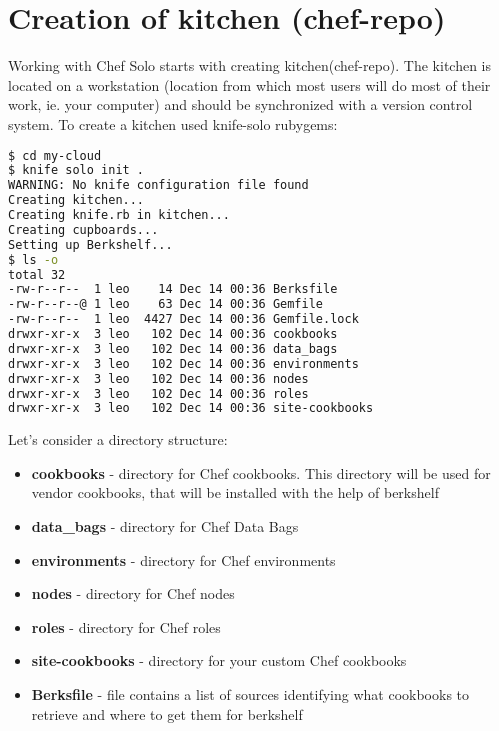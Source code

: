 \section{Creation of kitchen (chef-repo)}

Working with Chef Solo starts with creating kitchen(chef-repo). The kitchen is located on a workstation (location from which most users will do most of their work, ie. your computer) and should be synchronized with a version control system. To create a kitchen used knife-solo rubygems:

\begin{lstlisting}[language=Bash,label=lst:my-cloud-kitchen1,title=my-cloud]
$ cd my-cloud
$ knife solo init .
WARNING: No knife configuration file found
Creating kitchen...
Creating knife.rb in kitchen...
Creating cupboards...
Setting up Berkshelf...
$ ls -o
total 32
-rw-r--r--  1 leo    14 Dec 14 00:36 Berksfile
-rw-r--r--@ 1 leo    63 Dec 14 00:36 Gemfile
-rw-r--r--  1 leo  4427 Dec 14 00:36 Gemfile.lock
drwxr-xr-x  3 leo   102 Dec 14 00:36 cookbooks
drwxr-xr-x  3 leo   102 Dec 14 00:36 data_bags
drwxr-xr-x  3 leo   102 Dec 14 00:36 environments
drwxr-xr-x  3 leo   102 Dec 14 00:36 nodes
drwxr-xr-x  3 leo   102 Dec 14 00:36 roles
drwxr-xr-x  3 leo   102 Dec 14 00:36 site-cookbooks
\end{lstlisting}

Let's consider a directory structure:

\begin{itemize}
  \item \textbf{cookbooks} - directory for Chef cookbooks. This directory will be used for vendor cookbooks, that will be installed with the help of berkshelf
  \item \textbf{data\_bags} - directory for Chef Data Bags
  \item \textbf{environments} - directory for Chef environments
  \item \textbf{nodes} - directory for Chef nodes
  \item \textbf{roles} - directory for Chef roles
  \item \textbf{site-cookbooks} - directory for your custom Chef cookbooks
  \item \textbf{Berksfile} - file contains a list of sources identifying what cookbooks to retrieve and where to get them for berkshelf
\end{itemize}


